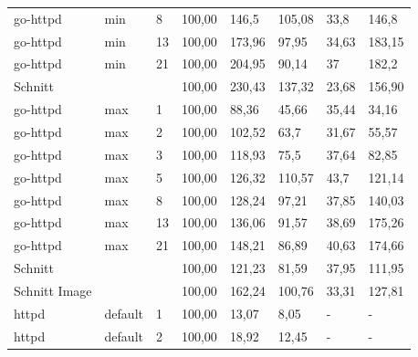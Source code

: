 \begin{footnotesize}
\begin{longtable}{llllllll}
		go-httpd       & min     & 8          & 100,00 & 146,5                       & 105,08                         & 33,8   & 146,8  \\
		go-httpd       & min     & 13         & 100,00 & 173,96                      & 97,95                          & 34,63  & 183,15 \\
		go-httpd       & min     & 21         & 100,00 & 204,95                      & 90,14                          & 37     & 182,2  \\ \hline
		Schnitt        &         &            & 100,00 & 230,43                      & 137,32                         & 23,68  & 156,90 \\ \hline
		go-httpd       & max     & 1          & 100,00 & 88,36                       & 45,66                          & 35,44  & 34,16  \\
		go-httpd       & max     & 2          & 100,00 & 102,52                      & 63,7                           & 31,67  & 55,57  \\
		go-httpd       & max     & 3          & 100,00 & 118,93                      & 75,5                           & 37,64  & 82,85  \\
		go-httpd       & max     & 5          & 100,00 & 126,32                      & 110,57                         & 43,7   & 121,14 \\
		go-httpd       & max     & 8          & 100,00 & 128,24                      & 97,21                          & 37,85  & 140,03 \\
		go-httpd       & max     & 13         & 100,00 & 136,06                      & 91,57                          & 38,69  & 175,26 \\
		go-httpd       & max     & 21         & 100,00 & 148,21                      & 86,89                          & 40,63  & 174,66 \\ \hline
		Schnitt        &         &            & 100,00 & 121,23                      & 81,59                          & 37,95  & 111,95 \\ \hline
		Schnitt Image  &         &            & 100,00 & 162,24                      & 100,76                         & 33,31  & 127,81 \\ \hline
		httpd          & default & 1          & 100,00 & 13,07                       & 8,05                           & -      & -      \\
		httpd          & default & 2          & 100,00 & 18,92                       & 12,45                          & -      & -      \\

\end{longtable}
\end{footnotesize}
